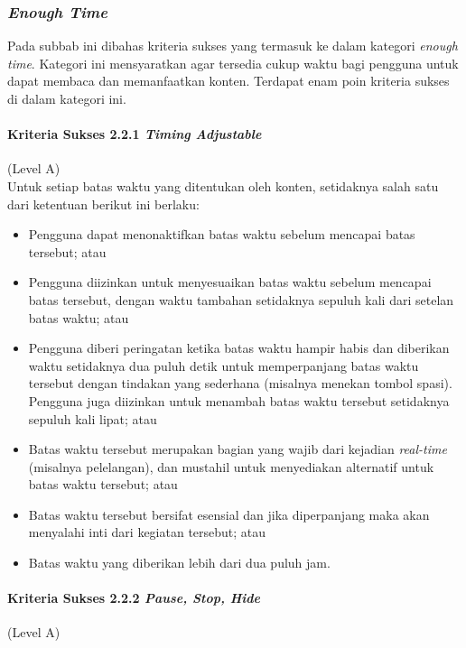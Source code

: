 \subsubsection{\textit{Enough Time}}
\label{sec:enough_time}
Pada subbab ini dibahas kriteria sukses yang termasuk ke dalam kategori \textit{enough time}. Kategori ini mensyaratkan agar tersedia cukup waktu bagi pengguna untuk dapat membaca dan memanfaatkan konten. Terdapat enam poin kriteria sukses di dalam kategori ini.

\paragraph{Kriteria Sukses 2.2.1 \textit{Timing Adjustable}}
\label{sec:kriteria_sukses_2.2.1}
(Level A)\\

Untuk setiap batas waktu yang ditentukan oleh konten, setidaknya salah satu dari ketentuan berikut ini berlaku:
\begin{itemize}
	\item Pengguna dapat menonaktifkan batas waktu sebelum mencapai batas tersebut; atau
	\item Pengguna diizinkan untuk menyesuaikan batas waktu sebelum mencapai batas tersebut, dengan waktu tambahan setidaknya sepuluh kali dari setelan batas waktu; atau
	\item Pengguna diberi peringatan ketika batas waktu hampir habis dan diberikan waktu setidaknya dua puluh detik untuk memperpanjang batas waktu tersebut dengan tindakan yang sederhana (misalnya menekan tombol spasi). Pengguna juga diizinkan untuk menambah batas waktu tersebut setidaknya sepuluh kali lipat; atau
	\item Batas waktu tersebut merupakan bagian yang wajib dari kejadian \textit{real-time} (misalnya pelelangan), dan mustahil untuk menyediakan alternatif untuk batas waktu tersebut; atau
	\item Batas waktu tersebut bersifat esensial dan jika diperpanjang maka akan menyalahi inti dari kegiatan tersebut; atau
	\item Batas waktu yang diberikan lebih dari dua puluh jam.
\end{itemize}

\paragraph{Kriteria Sukses 2.2.2 \textit{Pause, Stop, Hide}}
\label{sec:kriteria_sukses_2.2.2}
(Level A)\\

